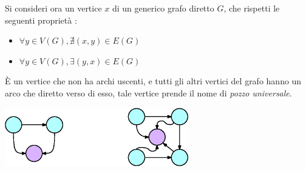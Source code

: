 \documentclass[12pt, letterpaper]{article}
\begin{document}
Si consideri ora un vertice $x$ di un generico grafo diretto $G$, che rispetti le seguenti proprietà : \begin{itemize}
    \item $\forall y\in V(G), \nexists (x,y)\in E(G)$
    \item $\forall y\in V(G), \exists (y,x)\in E(G)$
\end{itemize}
È un vertice che non ha archi uscenti, e tutti gli altri vertici del grafo hanno un arco che diretto verso di esso,
tale vertice prende il nome di \textit{pozzo universale}.\begin{center}
    \includegraphics[width=0.6\textwidth ]{images/pozzo.eps}
\end{center}
\end{document}
